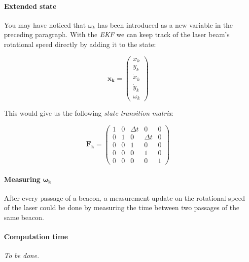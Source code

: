 \documentclass[a4paper, 12pt]{paper}
\begin{document}
\paragraph{Extended state}

You may have noticed that $\omega_k$ has been introduced as a new variable in
the preceding paragraph. With the \emph{EKF} we can keep track of the
laser beam's rotational speed directly by adding it to the state:


\begin{equation}
    \mathbf{x_k} = \left( \begin{array}{c} x_k     \\
                                           y_k     \\
                                           \dot{x}_k \\
                                           \dot{y}_k \\
                                           \omega_k \end{array} \right)
\label{eq:ekf_state}
\end{equation}

This would give us the following \emph{state transition matrix}:

\begin{equation}
    \mathbf{F_k} = \left( \begin{array}{ccccc} 1 & 0 & \Delta t & 0 & 0 \\
                                              0 & 1 & 0 & \Delta t & 0  \\
                                              0 & 0 & 1 & 0 & 0 \\
                                              0 & 0 & 0 & 1 & 0 \\
                                              0 & 0 & 0 & 0 & 1
                                        \end{array} \right)
\label{eq:ekf_state_trans}
\end{equation}

\paragraph{Measuring $\mathbf{\omega_k}$}

After every passage of a beacon, a measurement update on the rotational speed
of the laser could be done by measuring the time between two passages of the
same beacon.

\paragraph{Computation time}
\emph{To be done.}
\end{document}
